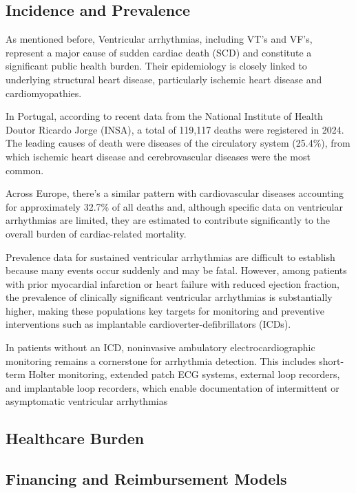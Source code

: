 \documentclass[conference]{IEEEtran}
\begin{document}
\subsection{Incidence and Prevalence}

As mentioned before, Ventricular arrhythmias, including VT's and VF's,
represent a major cause of sudden cardiac death (SCD) and constitute a
significant public health burden. Their epidemiology is closely linked to
underlying structural heart disease, particularly ischemic heart disease and
cardiomyopathies.

In Portugal, according to recent data from the National Institute of Health
Doutor Ricardo Jorge (INSA), a total of 119,117 deaths were registered in 2024.
The leading causes of death were diseases of the circulatory system (25.4\%),
from which ischemic heart disease and cerebrovascular diseases were the most
common.~\cite{ine_mortality}

Across Europe, there's a similar pattern with cardiovascular diseases accounting
for approximately 32.7\% of all deaths and, although specific data on ventricular arrhythmias 
are limited, they are estimated to contribute significantly to the overall burden of
cardiac-related mortality.~\cite{eurostat_deaths}

Prevalence data for sustained ventricular arrhythmias are difficult to
establish because many events occur suddenly and may be fatal. However,
among patients with prior myocardial infarction or heart failure with
reduced ejection fraction, the prevalence of clinically significant
ventricular arrhythmias is substantially higher, making these populations
key targets for monitoring and preventive interventions such as implantable
cardioverter-defibrillators (ICDs).

In patients without an ICD, noninvasive ambulatory electrocardiographic
monitoring remains a cornerstone for arrhythmia detection. This includes
short-term Holter monitoring, extended patch ECG systems, external loop
recorders, and implantable loop recorders, which enable documentation of
intermittent or asymptomatic ventricular arrhythmias~\cite{candinas_ventricular_1990}

\subsection{Healthcare Burden}
\subsection{Financing and Reimbursement Models}
\end{document}
